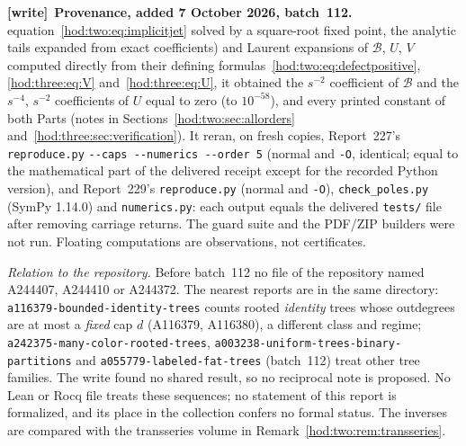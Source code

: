 \documentclass[11pt,letterpaper]{article}
\theoremstyle{definition}\newtheorem{definition}[theorem]{Definition}
\theoremstyle{remark}\newtheorem{remark}[theorem]{Remark}
\newcommand{\Bcal}{\mathcal B}
\newcommand{\file}[1]{\nolinkurl{#1}}
\newenvironment{writenote}[1][]{\par\smallskip\begingroup\small
 \noindent\textbf{[write]}\if\relax\detokenize{#1}\relax\else~\textbf{#1.}\fi\ }%
 {\par\endgroup\smallskip}
\begin{document}
\begin{writenote}[Provenance, added 7 October 2026, batch~112]
equation~\eqref{hod:two:eq:implicitjet} solved by a square-root fixed point,
the analytic tails expanded from exact coefficients) and Laurent expansions of
$\Bcal$, $U$, $V$ computed directly from their defining
formulas~\eqref{hod:two:eq:defectpositive}, \eqref{hod:three:eq:V}
and~\eqref{hod:three:eq:U}, it obtained the $s^{-2}$ coefficient of $\Bcal$
and the $s^{-4}$, $s^{-2}$ coefficients of $U$ equal to zero (to $10^{-58}$),
and every printed constant of both Parts (notes in
Sections~\ref{hod:two:sec:allorders} and~\ref{hod:three:sec:verification}).
It reran, on fresh copies, Report~227's \file{reproduce.py} \texttt{-{}-caps
-{}-numerics -{}-order 5} (normal and \texttt{-O}, identical; equal to the
mathematical part of the delivered receipt except for the recorded Python
version), and Report~229's \file{reproduce.py} (normal and \texttt{-O}),
\file{check_poles.py} (SymPy 1.14.0) and \file{numerics.py}: each output
equals the delivered \file{tests/} file after removing carriage returns. The
guard suite and the PDF/ZIP builders were not run. Floating computations are
observations, not certificates.

\emph{Relation to the repository.} Before batch~112 no file of the repository
named A244407, A244410 or A244372. The nearest reports are in the same
directory: \file{a116379-bounded-identity-trees} counts rooted
\emph{identity} trees whose outdegrees are at most a \emph{fixed} cap $d$
(A116379, A116380), a different class and regime;
\file{a242375-many-color-rooted-trees},
\file{a003238-uniform-trees-binary-partitions} and
\file{a055779-labeled-fat-trees} (batch~112) treat other tree families. The
write found no shared result, so no reciprocal note is proposed. No Lean or
Rocq file treats these sequences; no statement of this report is formalized,
and its place in the collection confers no formal status. The inverses are
compared with the transseries volume in Remark~\ref{hod:two:rem:transseries}.
\end{writenote}
\end{document}

